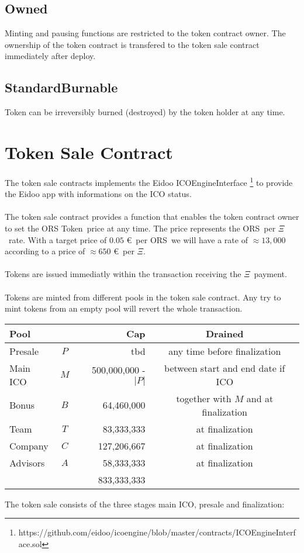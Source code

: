 \documentclass{article}
\newcommand{\ether}{$\Xi$}
\newcommand{\ors}{{\sf ORS}}
\newcommand{\orsT}{{\sf ORS Token}}
\begin{document}
\subsection{Owned}
Minting and pausing functions are restricted to the token contract owner. The
ownership of the token contract is transfered to the token sale contract immediately after deploy.
\subsection{StandardBurnable}
Token can be irreversibly burned (destroyed) by the token holder at any time.

\section{Token Sale Contract}
The token sale contracts implements the Eidoo 
ICOEngineInterface
\footnote{https://github.com/eidoo/icoengine/blob/master/contracts/ICOEngineInterface.sol} 
 to provide the Eidoo app with informations on the ICO status.\\\\ 
 The token sale contract provides a function that enables the token contract owner to set the \orsT \ price at any time. 
 The price represents the \ors  \ per \ether \ rate. With a target price of
 $0.05$ \euro \ per \ors \ we will have a rate of $\approx 13,000$ according to
 a  price of $\approx 650$ \euro \ per \ether. \\\\ Tokens are issued
 immediatly within the transaction receiving the \ether \ payment.
\\\\
\noindent
Tokens are minted from different pools in the token sale contract. Any try to
mint tokens from an empty pool will revert the whole transaction. 

\begin{center}
\begin{table}[h]
\begin{tabular}{l|c|r|c}


Pool & & Cap & Drained \\\hline
Presale & $P$ &  tbd& any time before finalization\\
Main ICO & $M$ &500,000,000 - $|P|$&between start  and end date if ICO\\
Bonus & $B$ & 64,460,000& together with $M$ and at finalization\\
Team &  $T$ & 83,333,333& at finalization \\
Company &  $C$ & 127,206,667& at finalization\\
Advisors &  $A$ & 58,333,333& at finalization\\\hline
&&833,333,333&\\
\end{tabular}
\end{table}
\end{center}
The token sale consists of the three stages main ICO, presale and finalization:
\end{document}
